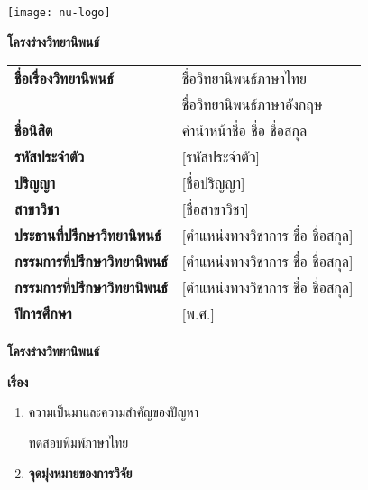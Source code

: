 \begin{titlepage}
  \begin{center}
    \texttt{[image: nu-logo]}
    
    \textbf{โครงร่างวิทยานิพนธ์}

  \end{center}


  \begin{table}[h]
    \centering
      \begin{tabular}{ll}
        \textbf{ชื่อเรื่องวิทยานิพนธ์} & ชื่อวิทยานิพนธ์ภาษาไทย \\

        & ชื่อวิทยานิพนธ์ภาษาอังกฤษ \\

        \textbf{ชื่อนิสิต} & คำนำหน้าชื่อ ชื่อ ชื่อสกุล \\

        \textbf{รหัสประจำตัว}	& [รหัสประจำตัว] \\

        \textbf{ปริญญา}	& [ชื่อปริญญา] \\

        \textbf{สาขาวิชา}	& [ชื่อสาขาวิชา] \\

        \textbf{ประธานที่ปรึกษาวิทยานิพนธ์}	& [ตำแหน่งทางวิชาการ ชื่อ ชื่อสกุล] \\

        \textbf{กรรมการที่ปรึกษาวิทยานิพนธ์}	& [ตำแหน่งทางวิชาการ ชื่อ ชื่อสกุล] \\

        \textbf{กรรมการที่ปรึกษาวิทยานิพนธ์}	& [ตำแหน่งทางวิชาการ ชื่อ ชื่อสกุล] \\

        \textbf{ปีการศึกษา}	& [พ.ศ.]
      \end{tabular}
    \end{table}

  \newpage

  \centering\textbf{โครงร่างวิทยานิพนธ์}

  \raggedright\textbf{เรื่อง}

  \begin{enumerate}
    \item{ความเป็นมาและความสำคัญของปัญหา}
    
    ทดสอบพิมพ์ภาษาไทย
    \lipsum[1-3]

    \item\textbf{จุดมุ่งหมายของการวิจัย}
    
    \lipsum[1-1]


\end{enumerate}
\end{titlepage}
